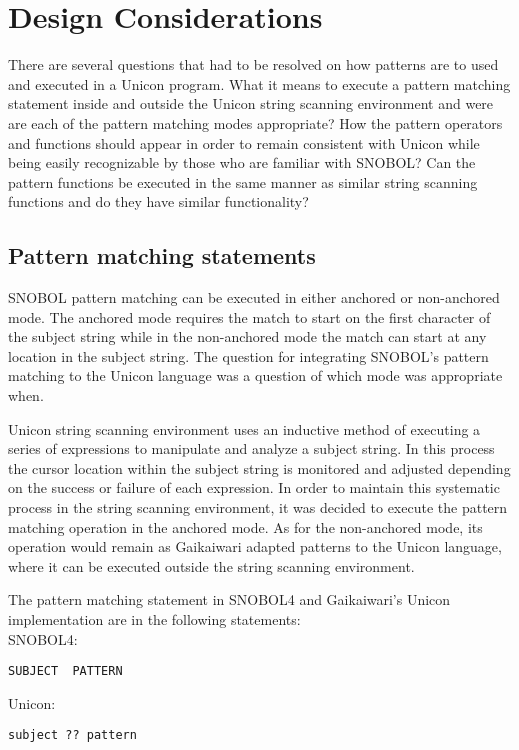 \documentclass{article}
\begin{document}
\section{Design Considerations}

There are several questions that had to be resolved on how patterns are to used and executed in a Unicon program.  What it means to execute a pattern matching statement inside and outside the Unicon string scanning environment and were are each of the pattern matching modes appropriate?  How the pattern operators and functions should appear in order to remain consistent with Unicon while being easily recognizable by those who are familiar with SNOBOL?  Can the pattern functions be executed in the same manner as similar string scanning functions and do they have similar functionality?

\subsection{Pattern matching statements}
SNOBOL pattern matching can be executed in either anchored or non-anchored mode.  The anchored mode requires the match to start on the first character of the subject string while in the non-anchored mode the match can start at any location in the subject string.\cite{Snobol}  The question for integrating SNOBOL's pattern matching to the Unicon language was a question of which mode was appropriate when.

Unicon string scanning environment uses an inductive method of executing a series of expressions to manipulate and analyze a subject string.  In this process the cursor location within the subject string is monitored and adjusted depending on the success or failure of each expression.  In order to maintain this systematic process in the string scanning environment, it was decided to execute the pattern matching operation in the anchored mode.  As for the non-anchored mode, its operation would remain as Gaikaiwari adapted patterns to the Unicon language, where it can be executed outside the string scanning environment.  

The pattern matching statement in SNOBOL4 and Gaikaiwari's Unicon implementation are in the following statements:\\

\noindent
SNOBOL4:
\begin{verbatim}
SUBJECT  PATTERN
\end{verbatim}
\noindent
Unicon:
\begin{verbatim}
subject ?? pattern
\end{verbatim}
\end{document}
